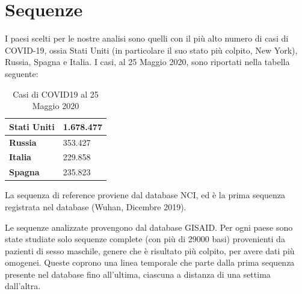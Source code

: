 \documentclass[a4paper,10pt]{article}
\begin{document}
\section{Sequenze}
I paesi scelti per le nostre analisi sono quelli con il più alto numero di casi di COVID-19, ossia Stati Uniti (in particolare il suo stato più colpito, New York), Russia, Spagna e Italia. I casi, al 25 Maggio 2020, sono riportati nella tabella seguente:

\begin{table}[H]
\centering
\begin{tabular}{|l|l|}
\hline
\textbf{Stati Uniti} & 1.678.477 \\ \hline
\textbf{Russia}      & 353.427   \\ \hline
\textbf{Italia}      & 229.858   \\ \hline
\textbf{Spagna}      & 235.823   \\ \hline
\end{tabular}
\caption{Casi di COVID19 al 25 Maggio 2020}
\end{table}
La sequenza di reference proviene dal database NCI, ed è la prima sequenza registrata nel database (Wuhan, Dicembre 2019).

\begin{table}[H]
\centering
{}
\caption{Sequenza di reference presa dal sito  \textcolor{black}{\href{https://www.ncbi.nlm.nih.gov/genbank/sars-cov-2-seqs/}{NCI}}}
\end{table}

Le sequenze analizzate provengono dal database GISAID. Per ogni paese sono state studiate solo sequenze complete (con più di 29000 basi) provenienti da pazienti di sesso maschile, genere che è risultato più colpito, per avere dati più omogenei. Queste coprono una linea temporale che parte dalla prima sequenza presente nel database fino all'ultima, ciascuna a distanza di una settima dall'altra.
\end{document}
